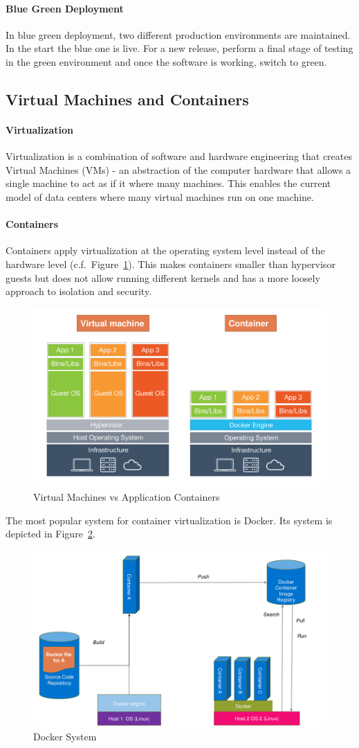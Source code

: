 \paragraph{Blue Green Deployment}
In blue green deployment, two different production environments are maintained.
In the start the blue one is live.
For a new release, perform a final stage of testing in the green environment and once the software is working, switch to green.

\subsection{Virtual Machines and Containers}
\paragraph{Virtualization}
Virtualization is a combination of software and hardware engineering that creates Virtual Machines (VMs) - an abstraction of the computer hardware that allows a single machine to act as if it where many machines.
This enables the current model of data centers where many virtual machines run on one machine.

\paragraph{Containers}
Containers apply virtualization at the operating system level instead of the hardware level (c.f.\ Figure~\ref{fig:container_vs_virtual_machines}).
This makes containers smaller than hypervisor guests but does not allow running different kernels and has a more loosely approach to isolation and security.\\
\begin{figure}[h]
  \centering
  \includegraphics[width=.8\textwidth]{images/container_vs_virtual_machines.png}
  \caption{Virtual Machines vs Application Containers}\label{fig:container_vs_virtual_machines}
\end{figure}

The most popular system for container virtualization is Docker.
Its system is depicted in Figure~\ref{fig:docker}.
\begin{figure}[h]
  \centering
  \includegraphics[width=.8\textwidth]{images/docker.png}
  \caption{Docker System}\label{fig:docker}
\end{figure}
